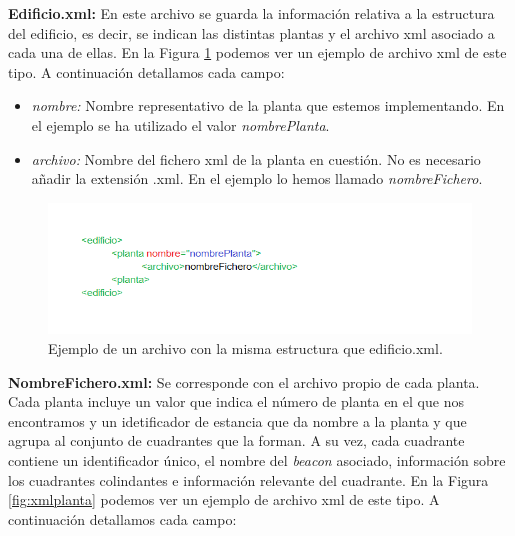 \textbf{Edificio.xml:} En este archivo se guarda la información relativa a la estructura del edificio, es decir, se indican las distintas plantas y el archivo xml asociado a cada una de ellas. En la Figura \ref{fig:xmledificio} podemos ver un ejemplo de archivo xml de este tipo. A continuación detallamos cada campo:
\begin{itemize}
	\item \textit{nombre:} Nombre representativo de la planta que estemos implementando. En el ejemplo se ha utilizado el valor \textit{nombrePlanta}.
	\item \textit{archivo:} Nombre del fichero xml de la planta en cuestión. No es necesario añadir la extensión .xml. En el ejemplo lo hemos llamado \textit{nombreFichero}.
\end{itemize}

\begin{figure}[t]
	\centering
	\includegraphics[width=1.1\textwidth]{Imagenes/Capitulo4/XMLEDIFICIO}
	\caption{Ejemplo de un archivo con la misma estructura que edificio.xml.}
	\label{fig:xmledificio}
\end{figure}

\textbf{NombreFichero.xml:} Se corresponde con el archivo propio de cada planta. Cada planta incluye un valor que indica el número de planta en el que nos encontramos y un idetificador de estancia que da nombre a la planta y que agrupa al conjunto de cuadrantes que la forman. A su vez, cada cuadrante contiene un identificador único, el nombre del \textit{beacon} asociado, información sobre los cuadrantes colindantes e información relevante del cuadrante. En la Figura \ref{fig:xmlplanta} podemos ver un ejemplo de archivo xml de este tipo. A continuación detallamos cada campo:

